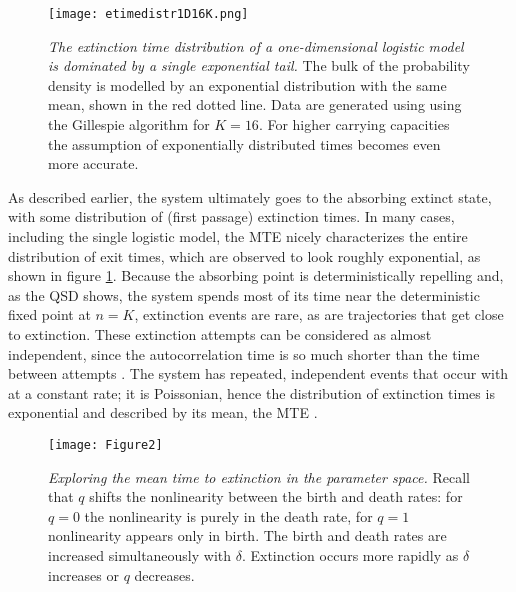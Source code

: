 \begin{figure}[h]
	\centering
	\texttt{[image: etimedistr1D16K.png]}
	\caption{\emph{The extinction time distribution of a one-dimensional logistic model is dominated by a single exponential tail.} 
	The bulk of the probability density is modelled by an exponential distribution with the same mean, shown in the red dotted line. 
	Data are generated using using the Gillespie algorithm for $K=16$. For higher carrying capacities the assumption of exponentially distributed times becomes even more accurate. 
	} \label{etimedistr}
\end{figure}

As described earlier, the system ultimately goes to the absorbing extinct state, with some distribution of (first passage) extinction times. %
In many cases, including the single logistic model, the MTE nicely characterizes the entire distribution of exit times, which are observed to look roughly exponential, as shown in figure \ref{etimedistr}.  
Because the absorbing point is deterministically repelling and, as the QSD shows, the system spends most of its time near the deterministic fixed point at $n=K$, extinction events are rare, as are trajectories that get close to extinction. 
These extinction attempts can be considered as almost independent, since the autocorrelation time is so much shorter than the time between attempts \cite{Hanggi1990,Lande1993}. %
The system has repeated, independent events that occur with at a constant rate; it is Poissonian, hence the distribution of extinction times is exponential and described by its mean, the MTE \cite{Hanggi1990,Leigh1981,Lande1993,Foley1994}. 

\begin{figure}[h]
	\centering
	\texttt{[image: Figure2]}
	\caption{\emph{Exploring the mean time to extinction in the parameter space.} Recall that $q$ shifts the nonlinearity between the birth and death rates: for $q=0$ the nonlinearity is purely in the death rate, for $q=1$ nonlinearity appears only in birth. The birth and death rates are increased simultaneously with $\delta$. Extinction occurs more rapidly as $\delta$ increases or $q$ decreases. } \label{mteCP}
\end{figure}

